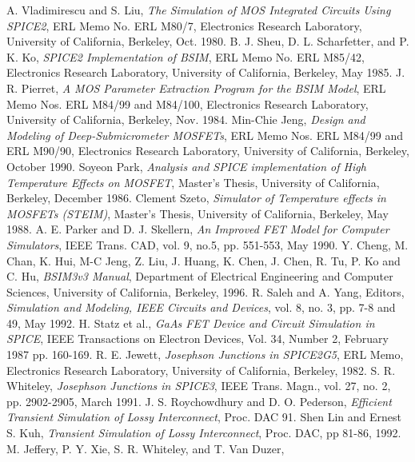 

\begin{thebibliography}{99}
A. Vladimirescu and S. Liu, {\em The Simulation of MOS
 Integrated Circuits Using SPICE2},  ERL Memo No. ERL M80/7, Electronics
 Research Laboratory, University of  California,  Berkeley, Oct. 1980.
B. J. Sheu, D. L. Scharfetter, and P. K. Ko,
 {\em SPICE2 Implementation of BSIM}, ERL Memo No. ERL M85/42, Electronics
 Research Laboratory, University of California, Berkeley, May 1985.
J. R. Pierret, {\em A MOS Parameter Extraction Program
 for the BSIM Model},  ERL Memo Nos. ERL M84/99 and M84/100, Electronics
 Research Laboratory, University of  California, Berkeley, Nov. 1984.
 Min-Chie Jeng, {\em Design and Modeling of Deep-Submicrometer
 MOSFETs}, ERL Memo Nos. ERL M84/99 and ERL M90/90, Electronics
 Research Laboratory, University of California, Berkeley, October 1990.
Soyeon Park, {\em Analysis and SPICE implementation of High
 Temperature Effects on MOSFET}, Master's Thesis, University of California,
 Berkeley, December 1986.
Clement Szeto, {\em Simulator of Temperature effects in
 MOSFETs (STEIM)}, Master's Thesis, University of California, Berkeley,
 May 1988.
A. E. Parker and D. J. Skellern, {\em An Improved FET Model
 for Computer Simulators}, IEEE Trans. CAD, vol. 9, no.5, pp. 551-553,
 May 1990.
Y. Cheng, M. Chan, K. Hui, M-C Jeng, Z. Liu, J. Huang,
 K. Chen, J. Chen, R. Tu, P. Ko and C. Hu, {\em BSIM3v3 Manual},
 Department of Electrical Engineering and Computer Sciences,
 University of California, Berkeley, 1996.
R. Saleh and A. Yang, Editors, {\em Simulation and Modeling,
 IEEE Circuits and Devices}, vol. 8, no. 3, pp. 7-8 and 49, May 1992. 
H. Statz et al., {\em GaAs FET Device and Circuit
 Simulation in SPICE}, IEEE Transactions on Electron Devices, Vol. 34,
 Number 2, February 1987 pp. 160-169.
R. E. Jewett, {\em Josephson Junctions in SPICE2G5},
 ERL Memo, Electronics Research Laboratory, University of California,
 Berkeley, 1982.
S. R. Whiteley, {\em Josephson Junctions in SPICE3},
 IEEE Trans. Magn., vol. 27, no. 2, pp. 2902-2905, March 1991.
J. S. Roychowdhury and D. O. Pederson, {\em Efficient
 Transient Simulation of Lossy Interconnect}, Proc. DAC 91.
Shen Lin and Ernest S. Kuh, {\em Transient Simulation of Lossy
 Interconnect}, Proc. DAC, pp 81-86, 1992.
M. Jeffery, P. Y. Xie, S. R. Whiteley, and T. Van Duzer,

\end{thebibliography}
